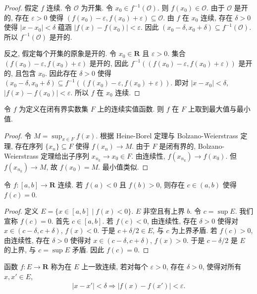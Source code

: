 \documentclass[../../main.tex]{subfiles}
\begin{document}
\begin{proof}
假定 $f$ 连续. 令 $\mathcal{O}$ 为开集. 令 $x_{0}\in f^{-1}(\mathcal{O})$. 则 $f(x_{0})\in\mathcal{O}$. 由于 $\mathcal{O}$ 是开的, 存在 $\varepsilon>0$ 使得 $(f(x_{0})-\varepsilon,f(x_{0})+\varepsilon)\subseteq\mathcal{O}$. 由 $f$ 在 $x_{0}$ 连续, 存在 $\delta>0$ 使得 $|x-x_{0}|<\delta$ 蕴涵 $|f(x)-f(x_{0})|<\varepsilon$. 因此 $(x_{0}-\delta,x_{0}+\delta)\subseteq f^{-1}(\mathcal{O})$. 所以 $f^{-1}(\mathcal{O})$ 是开的.

反之, 假定每个开集的原象是开的. 令 $x_{0}\in\mathbf{R}$ 且 $\varepsilon>0$. 集合 $(f(x_{0})-\varepsilon,f(x_{0})+\varepsilon)$ 是开的, 因此 $f^{-1}((f(x_{0})-\varepsilon,f(x_{0})+\varepsilon))$ 是开的, 且包含 $x_{0}$. 因此存在 $\delta>0$ 使得 $(x_{0}-\delta,x_{0}+\delta)\subseteq f^{-1}((f(x_{0})-\varepsilon,f(x_{0})+\varepsilon))$. 即对 $|x-x_{0}|<\delta$, $|f(x)-f(x_{0})|<\varepsilon$. 所以 $f$ 在 $x_{0}$ 连续.
\end{proof}

\begin{theorem}[极值定理]\label{theorem:ch01-极值}
令 $f$ 为定义在闭有界实数集 $F$ 上的连续实值函数. 则 $f$ 在 $F$ 上取到最大值与最小值.
\end{theorem}

\begin{proof}
令 $M=\sup_{x\in F}f(x)$. 根据 Heine-Borel 定理与 Bolzano-Weierstrass 定理, 存在序列 $\{x_{n}\}\subseteq F$ 使得 $f(x_{n})\to M$. 由于 $F$ 是闭有界的, Bolzano-Weierstrass 定理给出子序列 $x_{n_{k}}\to x_{0}\in F$. 由连续性, $f(x_{n_{k}})\to f(x_{0})$. 但 $f(x_{n_{k}})\to M$, 故 $f(x_{0})=M$. 最小值类似.
\end{proof}

\begin{theorem}[介值定理]\label{theorem:ch01-介值}
令 $f:[a,b]\to\mathbf{R}$ 连续. 若 $f(a)<0$ 且 $f(b)>0$, 则存在 $c\in(a,b)$ 使得 $f(c)=0$.
\end{theorem}

\begin{proof}
定义 $E=\{x\in[a,b]\mid f(x)<0\}$. $E$ 非空且有上界 $b$. 令 $c=\sup E$. 我们宣称 $f(c)=0$. 首先 $c\in[a,b]$. 若 $f(c)<0$, 由连续性, 存在 $\delta>0$ 使得对 $x\in(c-\delta,c+\delta)$, $f(x)<0$. 于是 $c+\delta/2\in E$, 与 $c$ 为上界矛盾. 若 $f(c)>0$, 由连续性, 存在 $\delta>0$ 使得对 $x\in(c-\delta,c+\delta)$, $f(x)>0$. 于是 $c-\delta/2$ 是 $E$ 的上界, 与 $c=\sup E$ 矛盾. 因此 $f(c)=0$.
\end{proof}

\begin{definition}[一致连续]\label{definition:ch01-一致连续}
函数 $f:E\to\mathbf{R}$ 称为在 $E$ 上一致连续, 若对每个 $\varepsilon>0$, 存在 $\delta>0$, 使得对所有 $x,x'\in E$,
\begin{align*}
|x-x'|<\delta\Longrightarrow|f(x)-f(x')|<\varepsilon.
\end{align*}
\end{definition}
\end{document}
